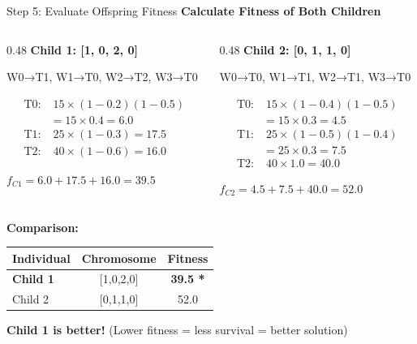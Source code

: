 \documentclass[aspectratio=169,10pt]{beamer}
\begin{document}
\begin{frame}{Step 5: Evaluate Offspring Fitness}
  \colorbox{navymid}{\color{teallt}\bfseries Calculate Fitness of Both Children}
  
  \vspace{0.3cm}
  \begin{columns}[T]
    \begin{column}{0.48\textwidth}
      \textbf{Child 1: [1, 0, 2, 0]}
      
      {\small W0→T1, W1→T0, W2→T2, W3→T0}
      
      {\scriptsize
      \begin{align*}
        \text{T0:} &\; 15 \times (1-0.2)(1-0.5) \\
               &= 15 \times 0.4 = 6.0 \\
        \text{T1:} &\; 25 \times (1-0.3) = 17.5 \\
        \text{T2:} &\; 40 \times (1-0.6) = 16.0
      \end{align*}}
      
      \colorbox{mygreen}{\color{white}\bfseries $f_{C1} = 6.0 + 17.5 + 16.0 = 39.5$}
    \end{column}
    
    \begin{column}{0.48\textwidth}
      \textbf{Child 2: [0, 1, 1, 0]}
      
      {\small W0→T0, W1→T1, W2→T1, W3→T0}
      
      {\scriptsize
      \begin{align*}
        \text{T0:} &\; 15 \times (1-0.4)(1-0.5) \\
               &= 15 \times 0.3 = 4.5 \\
        \text{T1:} &\; 25 \times (1-0.5)(1-0.4) \\
               &= 25 \times 0.3 = 7.5 \\
        \text{T2:} &\; 40 \times 1.0 = 40.0
      \end{align*}}
      
      \colorbox{amber}{\color{white}\bfseries $f_{C2} = 4.5 + 7.5 + 40.0 = 52.0$}
    \end{column}
  \end{columns}
  

  \textbf{Comparison:}

  \centering
  \begin{tabular}{lcc}
    \toprule
    \rowcolor{navymid}
    \color{white}\textbf{Individual} & \color{white}\textbf{Chromosome} & \color{white}\textbf{Fitness} \\
    \midrule
    \rowcolor{lightgreen}
    \textbf{Child 1} & [1,0,2,0] & \cellcolor{mygreen}\color{white}\textbf{39.5 *} \\
    Child 2 & [0,1,1,0] & 52.0 \\
    \bottomrule
  \end{tabular}
  

  {\small\textbf{Child 1 is better!} (Lower fitness = less survival = better solution)}
\end{frame}
\end{document}
